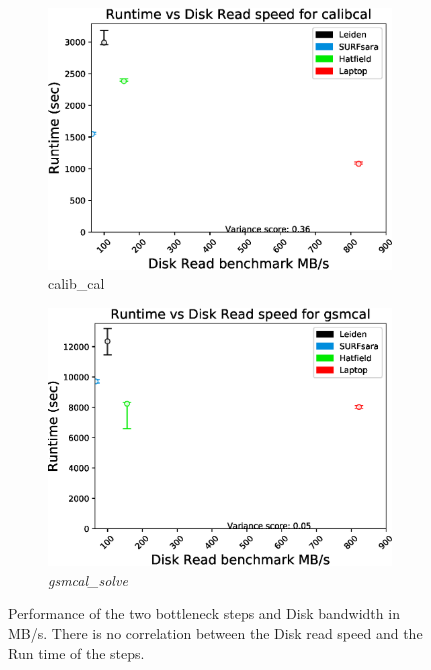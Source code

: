 \begin{figure}
  \centering
   \begin{subfigure}{.45\textwidth}
    \includegraphics[width=\textwidth]{ch4/figures/fig11/calibcal_HDD.eps}
      \caption{calib\_cal }
	\label{fig:ch4_calib_cal_HDD}
 \end{subfigure}
  \begin{subfigure}{.45\textwidth}
    \includegraphics[width=\textwidth]{ch4/figures/fig11/GSMcal_HDD.eps}
      \caption{\textit{gsmcal\_solve}}
	\label{fig:ch4_gsmcal_HDD}
 \end{subfigure}
 \label{fig:ch4_HDD_2_steps}
    \caption[Performance of the two bottleneck steps and Disk bandwidth in MB/s.]{Performance of the two bottleneck steps and Disk bandwidth in MB/s. There is no correlation between the Disk read speed and the Run time of the steps.} 
\end{figure}


